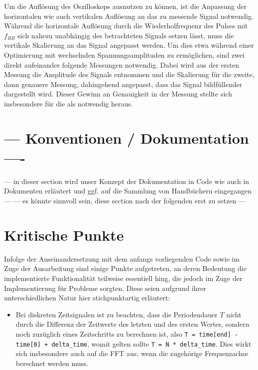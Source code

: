 \documentclass[../Report.tex]{subfiles}
\begin{document}
Um die Auflösung des Oszilloskops ausnutzen zu können, ist die Anpassung der horizontalen wie auch vertikalen Auflösung an das zu messende Signal notwendig.
Während die horizontale Auflösung durch die Wiederholfrequenz des Pulses mit $f_{BB}$ sich nahezu unabhängig des betrachteten Signals setzen lässt, muss die vertikale Skalierung an das Signal angepasst werden. Um dies etwa während einer Optimierung mit wechselnden Spannungsamplituden zu ermöglichen, sind zwei direkt aufeinander folgende Messungen notwendig. Dabei wird aus der ersten Messung die Amplitude des Signals entnommen und die Skalierung für die zweite, dann genauere Messung, dahingehend angepasst, dass das Signal bildfüllender dargestellt wird.
Dieser Gewinn an Genauigkeit in der Messung stellte sich insbesondere für die  als notwendig heraus.


\section{ --- Konventionen / Dokumentation ---- }
\label{sec:vorg.doku}
--- in dieser section wird unser Konzept der Dokumentation in Code wie auch in Dokumenten erläutert und ggf. auf die Sammlung von Handbüchern eingegangen --- 
--- es könnte sinnvoll sein, diese section nach der folgenden erst zu setzen ---


\section{Kritische Punkte}
\label{sec:vorg.critical}

Infolge der Auseinandersetzung mit dem anfangs vorliegenden Code sowie im Zuge der Ausarbeitung sind einige Punkte aufgetreten, an deren Bedeutung die implementierte Funktionalität teilweise essentiell hing, die jedoch im Zuge der Implementierung für Probleme sorgten. Diese seien aufgrund ihrer unterschiedlichen Natur hier stichpunktartig erläutert:
\begin{itemize}
	\item	Bei diskreten Zeitsignalen ist zu beachten, dass die Periodendauer $T$ nicht durch die Differenz der Zeitwerte des letzten und des ersten Wertes, sondern noch zuzüglich eines Zeitschritts  zu berechnen ist, also \lstinline{T = time[end] - time[0] + delta_time}, womit gelten sollte \lstinline{T = N * delta_time}. Dies wirkt sich insbesondere auch auf die FFT aus, wenn die zugehörige Frequenzachse berechnet werden muss.
\end{itemize}
\end{document}
